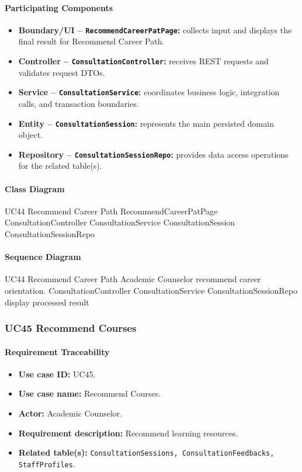 \paragraph{Participating Components}

\begin{itemize}
    \item \textbf{Boundary/UI -- \texttt{RecommendCareerPatPage}:} collects input and displays the final result for Recommend Career Path.
    \item \textbf{Controller -- \texttt{ConsultationController}:} receives REST requests and validates request DTOs.
    \item \textbf{Service -- \texttt{ConsultationService}:} coordinates business logic, integration calls, and transaction boundaries.
    \item \textbf{Entity -- \texttt{ConsultationSession}:} represents the main persisted domain object.
    \item \textbf{Repository -- \texttt{ConsultationSessionRepo}:} provides data access operations for the related table(s).
\end{itemize}

\paragraph{Class Diagram}

\ClassDiagram
{UC44 Recommend Career Path}
{RecommendCareerPatPage}
{ConsultationController}
{ConsultationService}
{ConsultationSession}
{ConsultationSessionRepo}

\paragraph{Sequence Diagram}

\SequenceDiagram
{UC44 Recommend Career Path}
{Academic Counselor}
{recommend career orientation.}
{ConsultationController}
{ConsultationService}
{ConsultationSessionRepo}
{display processed result}

\subsubsection{UC45 Recommend Courses}

\paragraph{Requirement Traceability}

\begin{itemize}
    \item \textbf{Use case ID:} UC45.
    \item \textbf{Use case name:} Recommend Courses.
    \item \textbf{Actor:} Academic Counselor.
    \item \textbf{Requirement description:} Recommend learning resources.
    \item \textbf{Related table(s):} \texttt{ConsultationSessions, ConsultationFeedbacks, StaffProfiles}.
\end{itemize}

